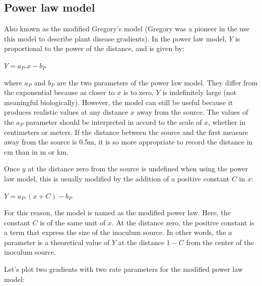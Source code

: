 \documentclass[
  letterpaper,
  DIV=11,
  numbers=noendperiod]{scrreprt}
\begin{document}
\hypertarget{power-law-model}{%
\subsection{Power law model}\label{power-law-model}}

Also known as the modified Gregory's model (Gregory was a pioneer in the
use this model to describe plant disease gradients). In the power law
model, \(Y\) is proportional to the power of the distance, and is given
by:

\(Y = a_{P}.x - b_{P}\)

where \(a_{P}\) and \(b_{P}\) are the two parameters of the power law
model. They differ from the exponential because as closer to \(x\) is to
zero, \(Y\) is indefinitely large (not meaningful biologically).
However, the model can still be useful because it produces realistic
values at any distance \(x\) away from the source. The values of the
\(a_{P}\) parameter should be interpreted in accord to the scale of
\(x\), whether in centimeters or meters. If the distance between the
source and the first measure away from the source is 0.5m, it is so more
appropriate to record the distance in cm than in m or km.

Once \(y\) at the distance zero from the source is undefined when using
the power law model, this is usually modified by the addition of a
positive constant \(C\) in \(x\):

\(Y = a_{P}.(x + C) - b_{P}\)

For this reason, the model is named as the modified power law. Here, the
constant \(C\) is of the same unit of \(x\). At the distance zero, the
positive constant is a term that express the size of the inoculum
source. In other words, the \(a\) parameter is a theoretical value of
\(Y\) at the distance \(1-C\) from the center of the inoculum source.

Let's plot two gradients with two rate parameters for the modified power
law model:
\end{document}
